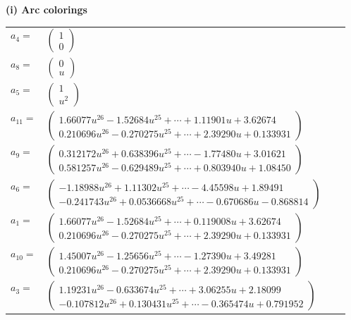 \documentclass[1p]{elsarticle_modified}
\theoremstyle{definition}
\begin{document}
\flushleft \textbf{(i) Arc colorings}\\
\begin{tabular}{m{7pt} m{180pt} m{7pt} m{180pt} }
\flushright $a_{4}=$&$\begin{pmatrix}1\\0\end{pmatrix}$ \\
\flushright $a_{8}=$&$\begin{pmatrix}0\\u\end{pmatrix}$ \\
\flushright $a_{5}=$&$\begin{pmatrix}1\\u^2\end{pmatrix}$ \\
\flushright $a_{11}=$&$\begin{pmatrix}1.66077 u^{26}-1.52684 u^{25}+\cdots+1.11901 u+3.62674\\0.210696 u^{26}-0.270275 u^{25}+\cdots+2.39290 u+0.133931\end{pmatrix}$ \\
\flushright $a_{9}=$&$\begin{pmatrix}0.312172 u^{26}+0.638396 u^{25}+\cdots-1.77480 u+3.01621\\0.581257 u^{26}-0.629489 u^{25}+\cdots+0.803940 u+1.08450\end{pmatrix}$ \\
\flushright $a_{6}=$&$\begin{pmatrix}-1.18988 u^{26}+1.11302 u^{25}+\cdots-4.45598 u+1.89491\\-0.241743 u^{26}+0.0536668 u^{25}+\cdots-0.670686 u-0.868814\end{pmatrix}$ \\
\flushright $a_{1}=$&$\begin{pmatrix}1.66077 u^{26}-1.52684 u^{25}+\cdots+0.119008 u+3.62674\\0.210696 u^{26}-0.270275 u^{25}+\cdots+2.39290 u+0.133931\end{pmatrix}$ \\
\flushright $a_{10}=$&$\begin{pmatrix}1.45007 u^{26}-1.25656 u^{25}+\cdots-1.27390 u+3.49281\\0.210696 u^{26}-0.270275 u^{25}+\cdots+2.39290 u+0.133931\end{pmatrix}$ \\
\flushright $a_{3}=$&$\begin{pmatrix}1.19231 u^{26}-0.633674 u^{25}+\cdots+3.06255 u+2.18099\\-0.107812 u^{26}+0.130431 u^{25}+\cdots-0.365474 u+0.791952\end{pmatrix}$ \\

\end{tabular}
\end{document}
